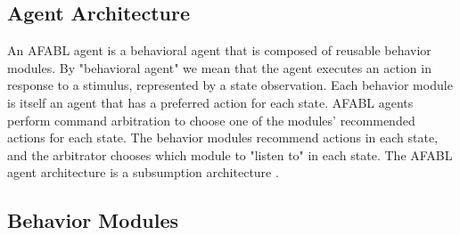 






\subsection{Agent Architecture}

An AFABL agent is a behavioral agent that is composed of reusable behavior modules.  By "behavioral agent" we mean that the agent executes an action in response to a stimulus, represented by a state observation.  Each behavior module is itself an agent that has a preferred action for each state.  AFABL agents perform command arbitration to choose one of the modules' recommended actions for each state.  The behavior modules recommend actions in each state, and the arbitrator chooses which module to "listen to" in each state.  The AFABL agent architecture is a subsumption architecture \cite{brooks1986a-robust}.

\subsection{Behavior Modules}

